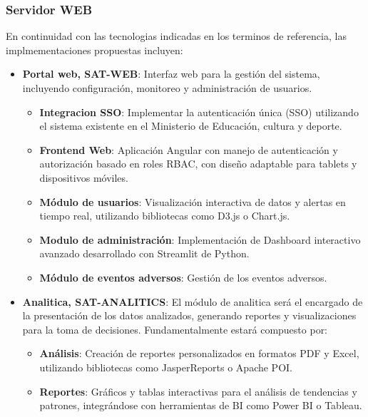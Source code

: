 \subsubsection{Servidor WEB}
En continuidad con las tecnologias indicadas en los terminos de referencia, las implmementaciones propuestas incluyen:

\begin{itemize}
    \item \textbf{Portal web, SAT-WEB}: Interfaz web para la gestión del sistema, incluyendo configuración, monitoreo y administración de usuarios.
    
    \begin{itemize}
        \item \textbf{Integracion SSO}: Implementar la autenticación única (SSO) utilizando el sistema existente en el Ministerio de Educación, cultura y deporte.
        \item \textbf{Frontend Web}: Aplicación Angular con manejo de autenticación y autorización basado en roles RBAC, con diseño adaptable para tablets y dispositivos móviles.
        \item \textbf{Módulo de usuarios}: Visualización interactiva de datos y alertas en tiempo real, utilizando bibliotecas como D3.js o Chart.js.
        \item \textbf{Modulo de administración}: Implementación de Dashboard interactivo avanzado desarrollado con Streamlit de Python.
        \item \textbf{Módulo de eventos adversos}: Gestión de los eventos adversos.
    \end{itemize}
    \item \textbf{Analitica, SAT-ANALITICS}: El módulo de analitica será el encargado de la presentación de los datos analizados, generando reportes y visualizaciones para la toma de decisiones. 
    Fundamentalmente estará compuesto por:
        \begin{itemize}
            \item \textbf{Análisis}: Creación de reportes personalizados en formatos PDF y Excel, utilizando bibliotecas como JasperReports o Apache POI.
            \item \textbf{Reportes}: Gráficos y tablas interactivas para el análisis de tendencias y patrones, integrándose con herramientas de BI como Power BI o Tableau.
        \end{itemize}
\end{itemize}


